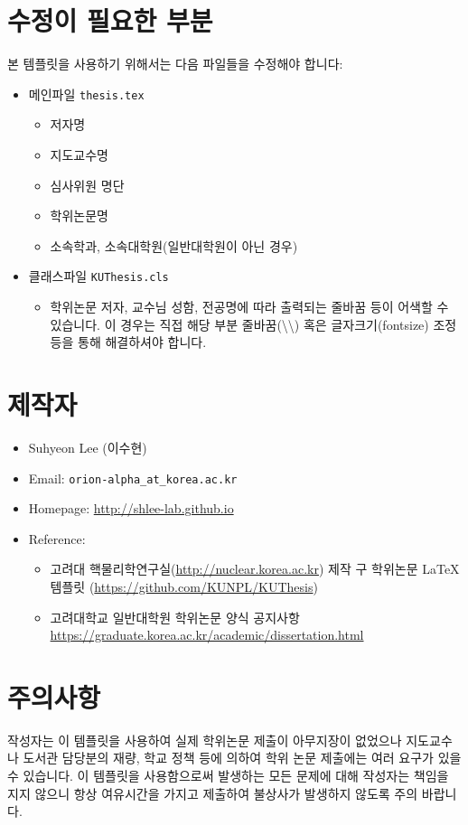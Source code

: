 \section{수정이 필요한 부분}
본 템플릿을 사용하기 위해서는 다음 파일들을 수정해야 합니다:
\begin{itemize}
  \item 메인파일 \texttt{thesis.tex}
  \begin{itemize}
      \item 저자명
      \item 지도교수명
      \item 심사위원 명단
      \item 학위논문명
      \item 소속학과, 소속대학원(일반대학원이 아닌 경우)
  \end{itemize}
  
  \item 클래스파일 \texttt{KUThesis.cls}
  \begin{itemize}
      \item 학위논문 저자, 교수님 성함, 전공명에 따라 출력되는 줄바꿈 등이 어색할 수 있습니다. 이 경우는 직접 해당 부분 줄바꿈(\textbackslash\textbackslash) 혹은 글자크기(fontsize) 조정 등을 통해 해결하셔야 합니다.
  \end{itemize}
  
\end{itemize}

\section{제작자}
\begin{itemize}
    \item Suhyeon Lee (이수현)
    \item Email: \texttt{orion-alpha\_at\_korea.ac.kr}
    \item Homepage: \url{http://shlee-lab.github.io}
    \item Reference:
    \begin{itemize}
        \item 고려대 핵물리학연구실(\url{http://nuclear.korea.ac.kr}) 제작 구 학위논문 LaTeX 템플릿 (\url{https://github.com/KUNPL/KUThesis})
        \item 고려대학교 일반대학원 학위논문 양식 공지사항 \url{https://graduate.korea.ac.kr/academic/dissertation.html}
    \end{itemize}
\end{itemize}

\section{주의사항}
작성자는 이 템플릿을 사용하여 실제 학위논문 제출이 아무지장이 없었으나 지도교수나 도서관 담당분의 재량, 학교 정책 등에 의하여 학위 논문 제출에는 여러 요구가 있을 수 있습니다. 이 템플릿을 사용함으로써 발생하는 모든 문제에 대해 작성자는 책임을 지지 않으니 항상 여유시간을 가지고 제출하여 불상사가 발생하지 않도록 주의 바랍니다.




